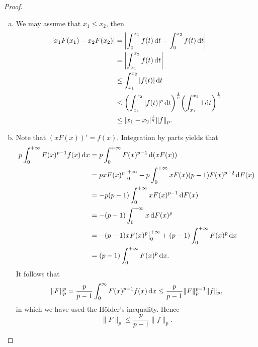 \begin{proof}
  \begin{enumerate}[(a)]
    \item We may assume that $x_1\leq x_2$, then
    \begin{align*}
        |x_1 F(x_1) - x_2 F(x_2)|
        & =\left|\int_0^{x_1}f(t)\mathop{}\!\mathrm{d} t-\int_0^{x_2}f(t)\mathop{}\!\mathrm{d} t\right| \\
        & =\left|\int_{x_1}^{x_2} f(t)\mathop{}\!\mathrm{d} t\right| \\
        & \leq \int_{x_1}^{x_2}|f(t)|\mathop{}\!\mathrm{d} t \\
        & \leq\biggl(\int_{x_1}^{x_2}|f(t)|^p\mathop{}\!\mathrm{d} t\biggr)^{\frac{1}{p}}\biggl(\int_{x_1}^{x_2} 1 \mathop{}\!\mathrm{d} t\biggr)^{\frac{1}{q}} \\
        & \leq |x_1-x_2|^{\frac{1}{q}}\|f\|_p.
    \end{align*}

    \item Note that $(xF(x))'=f(x)$. Integration by parts yields that
    \begin{align*}
        p\int_0^{+\infty} F(x)^{p-1}f(x)\mathop{}\!\mathrm{d} x
        & =p\int_0^{+\infty} F(x)^{p-1}\mathop{}\!\mathrm{d} (xF(x)) \\
        & =pxF(x)^p\big|_0^{+\infty}-p\int_0^{+\infty} xF(x)(p-1)F(x)^{p-2}\mathop{}\!\mathrm{d} F(x) \\
        & =-p(p-1)\int_0^{+\infty}xF(x)^{p-1}\mathop{}\!\mathrm{d} F(x) \\
        & =-(p-1)\int_0^{+\infty}x\mathop{}\!\mathrm{d} F(x)^p \\
        & =-(p-1)xF(x)^p\big|_0^{+\infty}+(p-1)\int_0^{+\infty} F(x)^p\mathop{}\!\mathrm{d} x \\
        & =(p-1)\int_0^{+\infty}F(x)^p\mathop{}\!\mathrm{d} x.
    \end{align*}
    It follows that
    \[\|F\|_p^p
       = \frac{p}{p-1} \int_0^\infty F(x)^{p-1} f(x) \mathop{}\!\mathrm{d} x
       \leq \frac{p}{p-1} \|F\|_p^{p-1} \|f\|_p,\]
    in which we have used the H\"older's inequality. Hence
    \[\|F\|_p \leq \frac{p}{p-1} \|f\|_p.\]
  \end{enumerate}
\end{proof}




